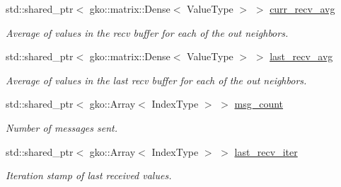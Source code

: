 \begin{DoxyCompactItemize}
\mbox{\label{structschwz_1_1Communicate_1_1comm__struct_a32ee6e3cb70ef147f40a7eaa00a88b17}} 
std\+::shared\+\_\+ptr$<$ gko\+::matrix\+::\+Dense$<$ Value\+Type $>$ $>$ \hyperlink{structschwz_1_1Communicate_1_1comm__struct_a32ee6e3cb70ef147f40a7eaa00a88b17}{curr\+\_\+recv\+\_\+avg}
\begin{DoxyCompactList}\small\item\em Average of values in the recv buffer for each of the out neighbors. \end{DoxyCompactList}\item 
\mbox{\label{structschwz_1_1Communicate_1_1comm__struct_a439a8670678ae1233a407f569c1ee31a}} 
std\+::shared\+\_\+ptr$<$ gko\+::matrix\+::\+Dense$<$ Value\+Type $>$ $>$ \hyperlink{structschwz_1_1Communicate_1_1comm__struct_a439a8670678ae1233a407f569c1ee31a}{last\+\_\+recv\+\_\+avg}
\begin{DoxyCompactList}\small\item\em Average of values in the last recv buffer for each of the out neighbors. \end{DoxyCompactList}\item 
\mbox{\label{structschwz_1_1Communicate_1_1comm__struct_a873848ca5b8ef34ef2efa60434593def}} 
std\+::shared\+\_\+ptr$<$ gko\+::\+Array$<$ Index\+Type $>$ $>$ \hyperlink{structschwz_1_1Communicate_1_1comm__struct_a873848ca5b8ef34ef2efa60434593def}{msg\+\_\+count}
\begin{DoxyCompactList}\small\item\em Number of messages sent. \end{DoxyCompactList}\item 
\mbox{\label{structschwz_1_1Communicate_1_1comm__struct_ad5e8ca98e2d75d3cd6193743ce61c2ea}} 
std\+::shared\+\_\+ptr$<$ gko\+::\+Array$<$ Index\+Type $>$ $>$ \hyperlink{structschwz_1_1Communicate_1_1comm__struct_ad5e8ca98e2d75d3cd6193743ce61c2ea}{last\+\_\+recv\+\_\+iter}
\begin{DoxyCompactList}\small\item\em Iteration stamp of last received values. \end{DoxyCompactList}\item 
\mbox{\label{structschwz_1_1Communicate_1_1comm__struct_a3425c5c8ba13672ac505000dc3088a65}} 

\end{DoxyCompactItemize}
